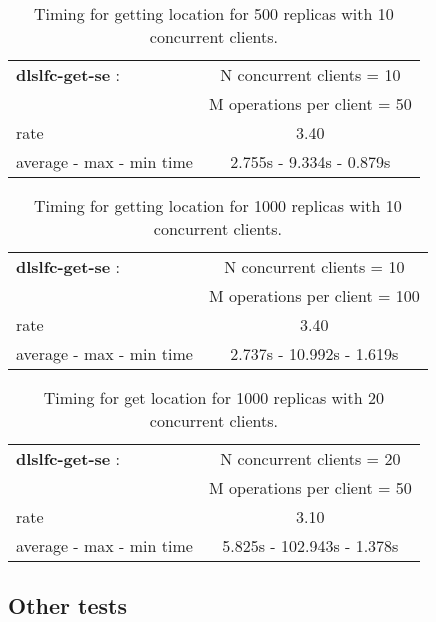 \documentclass[pdftex]{cmspaper}
\begin{document}
\begin{table}[!htbp]
\begin{center}
 \begin{tabular}{|l|c|}         \hline
   {\bf dlslfc-get-se} : & N concurrent clients = 10 \\ 
    & M operations per client = 50\\ \hline
    rate             & 3.40 \\ \hline
    average - max - min time     &  2.755s - 9.334s - 0.879s \\ \hline
\end{tabular}
\caption {Timing for getting location for 500 replicas with 10 concurrent clients.}\label{dlslfc-get-se}
\end{center}
\end{table}

\begin{table}[!htbp]
\begin{center}
 \begin{tabular}{|l|c|}         \hline
   {\bf dlslfc-get-se} : & N concurrent clients = 10  \\
   & M operations per client = 100\\ \hline
    rate             & 3.40 \\ \hline
    average - max - min time     &  2.737s - 10.992s - 1.619s \\ \hline
\end{tabular}
\caption {Timing for getting location for 1000 replicas with 10 concurrent clients.}\label{dlslfc-get-se}
\end{center}
\end{table}

\begin{table}[!htbp]
\begin{center}
 \begin{tabular}{|l|c|}         \hline
   {\bf dlslfc-get-se} : & N concurrent clients = 20  \\ 
 & M operations per client = 50\\ \hline
    rate             &  3.10 \\ \hline
    average - max - min time     &   5.825s - 102.943s - 1.378s \\ \hline
\end{tabular}
\caption {Timing for get location for 1000 replicas with 20 concurrent clients.}\label{dlslfc-get-se}
\end{center}
\end{table}
\subsection {Other tests}
\end{document}
